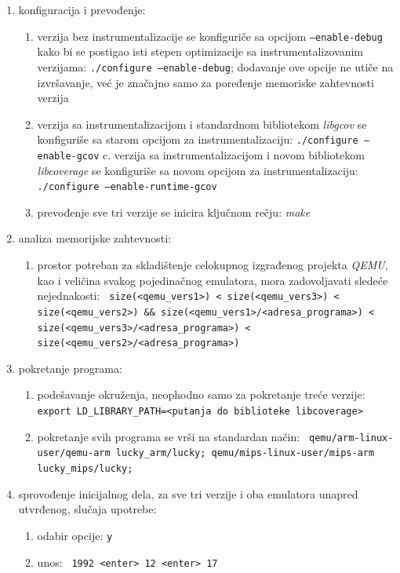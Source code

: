 \documentclass[12pt,oneside]{memoir}
\newcommand{\kod}[1]{\texttt{#1}}
\newcommand{\strano}[1]{\textit{#1}}
\begin{document}
\begin{enumerate}

\item konfiguracija i prevođenje:
\begin{enumerate}
\item verzija bez instrumentalizacije se konfiguriče sa opcijom \kod{–enable-debug} kako bi se postigao isti stepen optimizacije sa instrumentalizovanim verzijama: \kod{./configure –enable-debug}; dodavanje ove opcije ne utiče na izvršavanje, već je značajno samo za poređenje memoriske zahtevnosti verzija
\item verzija sa instrumentalizacijom i standardnom bibliotekom \strano{libgcov} se konfiguriše sa starom opcijom za instrumentalizaciju: \kod{./configure –enable-gcov}
c. verzija sa instrumentalizacijom i novom bibliotekom \strano{libcoverage} se konfiguriše sa novom opcijom za instrumentalizaciju: \kod{./configure –enable-runtime-gcov}
\item prevođenje sve tri verzije se inicira ključnom rečju: \strano{make}
\end{enumerate}

\item analiza memorijske zahtevnosti:
\begin{enumerate}
\item prostor potreban za skladištenje celokupnog izgrađenog projekta \strano{QEMU}, kao i veličina svakog pojedinačnog emulatora, mora zadovoljavati sledeće nejednakosti:
\kod{ size(<qemu\_vers1>) < size(<qemu\_vers3>) < size(<qemu\_vers2>) \&\& size(<qemu\_vers1>/<adresa\_programa>) < size(<qemu\_vers3>/<adresa\_programa>) < size(<qemu\_vers2>/<adresa\_programa>) }
\end{enumerate}

\item pokretanje programa:
\begin{enumerate}
\item podešavanje okruženja, neophodno samo za pokretanje treće verzije: \kod{ export LD\_LIBRARY\_PATH=<putanja do biblioteke libcoverage>}
\item pokretanje svih programa se vrši na standardan način: \kod{ qemu/arm-linux-user/qemu-arm lucky\_arm/lucky; qemu/mips-linux-user/mips-arm lucky\_mips/lucky;}
\end{enumerate}

\item sprovođenje inicijalnog dela, za sve tri verzije i oba emulatora unapred utvrđenog, slučaja upotrebe:
\begin{enumerate}
\item odabir opcije: \kod{y}
\item unos: \kod{ 1992 <enter> 12 <enter> 17}
\end{enumerate}


\end{enumerate}
\end{document}
